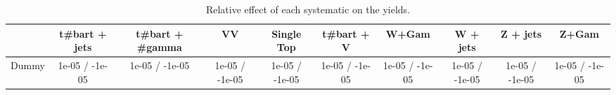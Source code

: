 \begin{table}[htbp]
\begin{center}
\footnotesize
\begin{tabular}{|c|c|c|c|c|c|c|c|c|c|}
\hline 
      & t#bar{t} + jets      & t#bar{t} +  #gamma      & VV      & Single Top      & t#bar{t} + V      & W+Gam      & W + jets      & Z + jets      & Z+Gam \\ 
\hline 
  Dummy & 1e-05 / -1e-05 & 1e-05 / -1e-05 & 1e-05 / -1e-05 & 1e-05 / -1e-05 & 1e-05 / -1e-05 & 1e-05 / -1e-05 & 1e-05 / -1e-05 & 1e-05 / -1e-05 & 1e-05 / -1e-05 \\ 
\hline 
\end{tabular} 
\caption{Relative effect of each systematic on the yields.} 
\end{center} 
\end{table} 
